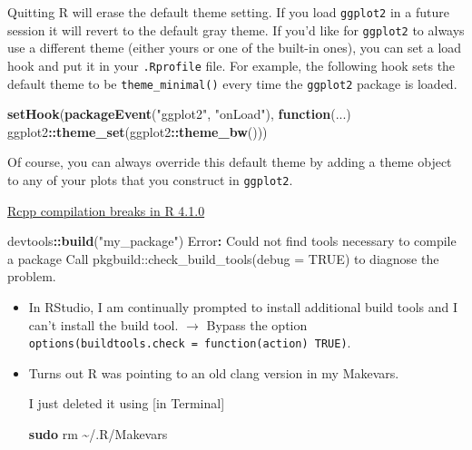 \documentclass[
  a4paper,
  twoside,
  openright]{book}
\newenvironment{Shaded}{\begin{snugshade}}{\end{snugshade}}
\newcommand{\AttributeTok}[1]{\textcolor[rgb]{0.13,0.29,0.53}{#1}}
\newcommand{\ControlFlowTok}[1]{\textcolor[rgb]{0.13,0.29,0.53}{\textbf{#1}}}
\newcommand{\FunctionTok}[1]{\textcolor[rgb]{0.13,0.29,0.53}{\textbf{#1}}}
\newcommand{\NormalTok}[1]{#1}
\newcommand{\SpecialCharTok}[1]{\textcolor[rgb]{0.81,0.36,0.00}{\textbf{#1}}}
\newcommand{\StringTok}[1]{\textcolor[rgb]{0.31,0.60,0.02}{#1}}
\theoremstyle{definition}
\theoremstyle{definition}
\theoremstyle{definition}
\theoremstyle{definition}
\theoremstyle{remark}
\begin{document}
Quitting R will erase the default theme setting. If you load \texttt{ggplot2} in a future session it will revert to the default gray theme. If you'd like for \texttt{ggplot2} to always use a different theme (either yours or one of the built-in ones), you can set a load hook and put it in your \texttt{.Rprofile} file. For example, the following hook sets the default theme to be \texttt{theme\_minimal()} every time the \texttt{ggplot2} package is loaded.

\begin{Shaded}
\begin{Highlighting}[]
\FunctionTok{setHook}\NormalTok{(}\FunctionTok{packageEvent}\NormalTok{(}\StringTok{"ggplot2"}\NormalTok{, }\StringTok{"onLoad"}\NormalTok{), }
        \ControlFlowTok{function}\NormalTok{(...) ggplot2}\SpecialCharTok{::}\FunctionTok{theme\_set}\NormalTok{(ggplot2}\SpecialCharTok{::}\FunctionTok{theme\_bw}\NormalTok{()))}
\end{Highlighting}
\end{Shaded}

Of course, you can always override this default theme by adding a theme object to any of your plots that you construct in \texttt{ggplot2}.

\href{https://community.rstudio.com/t/rcpp-compilation-breaks-in-r-4-1-0-running-on-big-sur-11-4/109744}{Rcpp compilation breaks in R 4.1.0}

\begin{Shaded}
\begin{Highlighting}[]
\NormalTok{devtools}\SpecialCharTok{::}\FunctionTok{build}\NormalTok{(}\StringTok{"my\_package"}\NormalTok{)}
\NormalTok{Error}\SpecialCharTok{:}\NormalTok{ Could not find tools necessary to compile a package}
\NormalTok{Call }\StringTok{\textasciigrave{}}\AttributeTok{pkgbuild::check\_build\_tools(debug = TRUE)}\StringTok{\textasciigrave{}}\NormalTok{ to diagnose the problem.}
\end{Highlighting}
\end{Shaded}

\begin{itemize}
\item
  In RStudio, I am continually prompted to install additional build tools and I can't install the build tool. \(\rightarrow\) Bypass the option \texttt{options(buildtools.check\ =\ function(action)\ TRUE)}.
\item
  Turns out R was pointing to an old clang version in my Makevars.

  I just deleted it using {[}in Terminal{]}

\begin{Shaded}
\begin{Highlighting}[]
\FunctionTok{sudo}\NormalTok{ rm \textasciitilde{}/.R/Makevars}
\end{Highlighting}
\end{Shaded}
\end{itemize}
\end{document}
